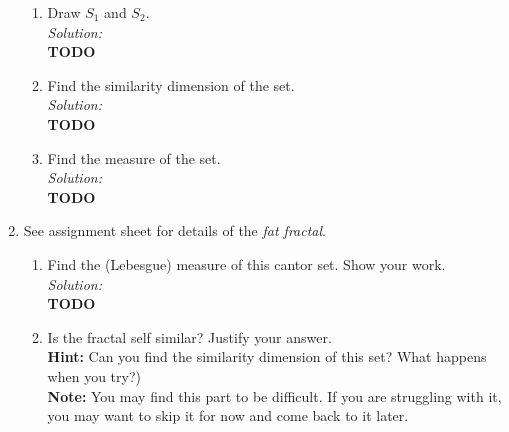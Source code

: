 \documentclass[10pt]{amsart}
\theoremstyle{nonumberplain}
\begin{document}
\begin{enumerate}[label={\bf {\arabic*}:}]
\begin{enumerate}
\item Draw $S_1$ and $S_2$. \\

\textit{Solution:} \\
\textbf{TODO} \\

\item Find the similarity dimension of the set. \\

\textit{Solution:} \\
\textbf{TODO} \\

\item Find the measure of the set. \\

\textit{Solution:} \\
\textbf{TODO} \\

\end{enumerate}

\newpage

\item See assignment sheet for details of the \textit{fat fractal}. \\

\begin{enumerate}
\item Find the (Lebesgue) measure of this cantor set. Show your work. \\

\textit{Solution:} \\
\textbf{TODO} \\

\item Is the fractal self similar?
Justify your answer. \\
\textbf{Hint:} Can you find the similarity dimension of this set?
What happens when you try?) \\
\textbf{Note:} You may find this part to be difficult.
If you are struggling with it, you may want to skip it for now and come back to it later. 
\\
\end{enumerate}
 
 \newpage
 

\end{enumerate}
\end{document}

